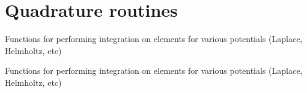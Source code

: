 \section{Quadrature routines}
\label{group__quadrature}


Functions for performing integration on elements for various potentials (Laplace, Helmholtz, etc)  


Functions for performing integration on elements for various potentials (Laplace, Helmholtz, etc) 

